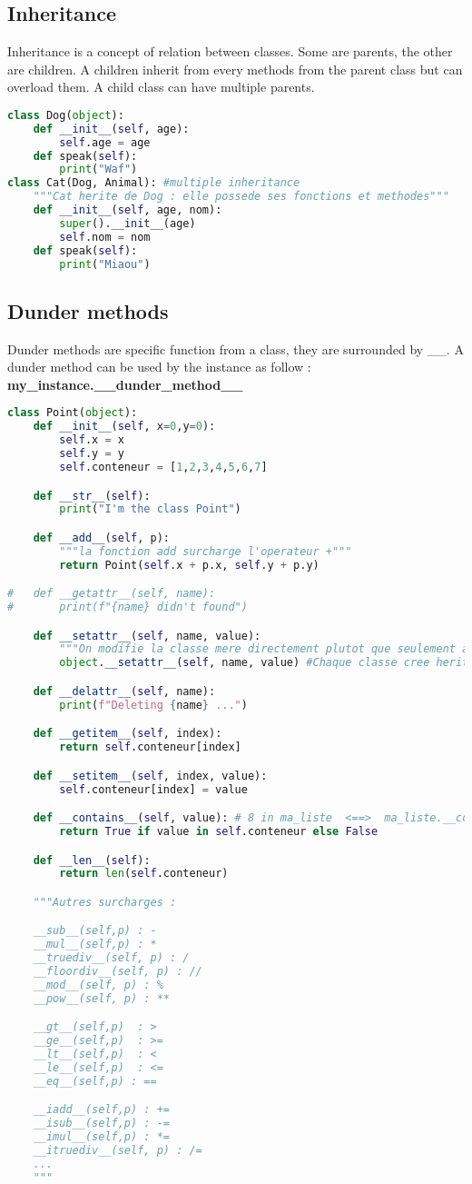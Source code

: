 \documentclass[a4paper, 12pt, titlepage]{scrartcl} %
\begin{document}
\subsection{Inheritance}
Inheritance is a concept of relation between classes. Some are parents, the other are children. A children inherit from every methods from the parent class but can overload them. A child class can have multiple parents.
\begin{lstlisting}[language=Python]
class Dog(object):
	def __init__(self, age):
		self.age = age
	def speak(self):
		print("Waf")
class Cat(Dog, Animal): #multiple inheritance
	"""Cat herite de Dog : elle possede ses fonctions et methodes"""
	def __init__(self, age, nom):
		super().__init__(age)
		self.nom = nom
	def speak(self):
		print("Miaou")
\end{lstlisting}

\subsection{Dunder methods}
Dunder methods are specific function from a class, they are surrounded by \_\_. A dunder method can be used by the instance as follow :\\ \textbf{my\_instance.\_\_dunder\_method\_\_}
\begin{lstlisting}[language=Python]
class Point(object):
	def __init__(self, x=0,y=0):
		self.x = x
		self.y = y
		self.conteneur = [1,2,3,4,5,6,7]

	def __str__(self):
		print("I'm the class Point")

	def __add__(self, p):
		"""la fonction add surcharge l'operateur +"""
		return Point(self.x + p.x, self.y + p.y)

#	def __getattr__(self, name):
#		print(f"{name} didn't found")

	def __setattr__(self, name, value):
		"""On modifie la classe mere directement plutot que seulement appeler setaatr de cette classe et tourner en boucle sur la meme methode"""
		object.__setattr__(self, name, value) #Chaque classe cree herite de base de la classe object

	def __delattr__(self, name):
		print(f"Deleting {name} ...")

	def __getitem__(self, index):
		return self.conteneur[index]

	def __setitem__(self, index, value):
		self.conteneur[index] = value

	def __contains__(self, value): # 8 in ma_liste  <==>  ma_liste.__contains__(8)
		return True if value in self.conteneur else False

	def __len__(self):
		return len(self.conteneur)

	"""Autres surcharges : 

	__sub__(self,p) : -
	__mul__(self,p) : *
	__truediv__(self, p) : /
	__floordiv__(self, p) : //
	__mod__(self, p) : %
	__pow__(self, p) : **

	__gt__(self,p)  : >
	__ge__(self,p) 	: >=
	__lt__(self,p)  : <
	__le__(self,p)  : <=
	__eq__(self,p) : == 

	__iadd__(self,p) : +=
	__isub__(self,p) : -=
	__imul__(self,p) : *=
	__itruediv__(self, p) : /=	
	...
	"""
\end{lstlisting}
\end{document}
